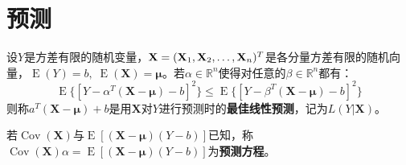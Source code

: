 \section{预测}

\begin{definition}
	设$Y$是方差有限的随机变量，$\mathbf{X}=(\mathbf{X}_1, \mathbf{X}_2, \dots, \mathbf{X}_{n})^T$是各分量方差有限的随机向量，$\operatorname{E}(Y)=b,\;\operatorname{E}(\mathbf{X})=\boldsymbol{\mu}$。若$\alpha\in\mathbb{R}^{n}$使得对任意的$\beta\in\mathbb{R}^{n}$都有：
	\begin{equation*}
		\operatorname{E}\{[Y-\alpha^T(\mathbf{X}-\boldsymbol{\mu})-b]^2\}\leqslant\operatorname{E}\{[Y-\beta^T(\mathbf{X}-\boldsymbol{\mu})-b]^2\}
	\end{equation*}
	则称$a^T(\mathbf{X}-\boldsymbol{\mu})+b$是用$\mathbf{X}$对$Y$进行预测时的\textbf{最佳线性预测}，记为$L(Y|\mathbf{X})$。
\end{definition}
\begin{definition}
	若$\operatorname{Cov}(\mathbf{X})$与$\operatorname{E}[(\mathbf{X}-\boldsymbol{\mu})(Y-b)]$已知，称$\operatorname{Cov}(\mathbf{X})\alpha=\operatorname{E}[(\mathbf{X}-\boldsymbol{\mu})(Y-b)]$为\textbf{预测方程}。
\end{definition}
